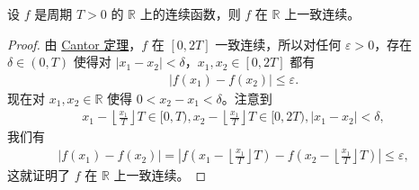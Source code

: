 \documentclass[../../main.tex]{subfiles}
\begin{document}
\begin{proposition}[连续周期函数必一致连续]\label{proposition:连续周期函数必一致连续}
设 \(f\) 是周期 \(T > 0\) 的 \(\mathbb{R}\) 上的连续函数，则 \(f\) 在 \(\mathbb{R}\) 上一致连续。
\end{proposition}
\begin{proof}
由 \hyperref[theorem:Cantor定理]{Cantor 定理}，\(f\) 在 \([0, 2T]\) 一致连续，所以对任何 \(\varepsilon > 0\)，存在 \(\delta \in (0, T)\) 使得对 \(|x_1 - x_2| < \delta\)，\(x_1, x_2 \in [0, 2T]\) 都有
\begin{align*}
|f(x_1) - f(x_2)| \leqslant \varepsilon.
\end{align*}
现在对 \(x_1, x_2 \in \mathbb{R}\) 使得 \(0 < x_2 - x_1 < \delta\)。注意到
\begin{align*}
x_1 - \left\lfloor \frac{x_1}{T} \right\rfloor T \in [0, T), x_2 - \left\lfloor \frac{x_1}{T} \right\rfloor T \in [0, 2T), |x_1 - x_2| < \delta,
\end{align*}
我们有
\begin{align*}
|f(x_1) - f(x_2)| = \left| f\left( x_1 - \left\lfloor \frac{x_1}{T} \right\rfloor T \right) - f\left( x_2 - \left\lfloor \frac{x_1}{T} \right\rfloor T \right) \right| \leqslant \varepsilon,
\end{align*}
这就证明了 \(f\) 在 \(\mathbb{R}\) 上一致连续。 
\end{proof}
\end{document}
